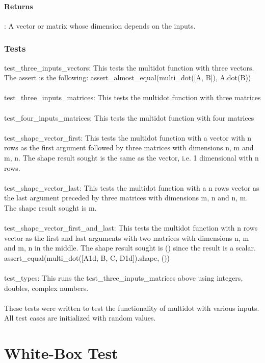 \paragraph{Returns}: A vector or matrix whose dimension depends on the inputs. 
\subsubsection{Tests}
test\_three\_inputs\_vectors: This tests the multidot function with three vectors. The assert is the following: assert\_almost\_equal(multi\_dot([A, B]), A.dot(B))\\
\\
test\_three\_inputs\_matrices: This tests the multidot function with three matrices\\
\\
test\_four\_inputs\_matrices: This tests the multidot function with four matrices\\
\\
test\_shape\_vector\_first: This tests the multidot function with a vector with n rows as the first argument followed by three matrices with dimensions n, m and m, n. The shape result sought is the same as the vector, i.e. 1 dimensional with n rows. \\
\\
test\_shape\_vector\_last: This tests the multidot function with a n rows vector as the last argument preceded by three matrices with dimensions m, n and n, m. The shape result sought is m. \\
\\
test\_shape\_vector\_first\_and\_last: This tests the multidot function with n rows vector as the first and last arguments with two matrices with dimensions n, m and m, n in the middle. The shape result sought is () since the result is a scalar. assert\_equal(multi\_dot([A1d, B, C, D1d]).shape, ())\\
\\
test\_types: This runs the test\_three\_inputs\_matrices above using integers, doubles, complex numbers. \\
\\
These tests were written to test the functionality of multidot with various inputs. All test cases are initialized with random values. 

\section{White-Box Test}



